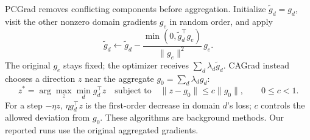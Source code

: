 PCGrad \citep{yu2020gradientsurgerymultitasklearning} removes conflicting components before aggregation. Initialize $\tilde g_d=g_d$, visit the other nonzero domain gradients $g_e$ in random order, and apply
\begin{equation}
\tilde g_d\leftarrow\tilde g_d-
\frac{\min(0,\tilde g_d^\top g_e)}{\|g_e\|^2}\,g_e.
\label{eq:pcgrad}
\end{equation}
The original $g_e$ stays fixed; the optimizer receives $\sum_d\lambda_d\tilde g_d$. CAGrad \citep{liu2024conflictaversegradientdescentmultitask} instead chooses a direction $z$ near the aggregate $g_0=\sum_d\lambda_d g_d$:
\begin{equation}
z^*=\arg\max_z\min_d g_d^\top z
\quad\text{subject to}\quad
\|z-g_0\|\leq c\|g_0\|,\qquad 0\leq c<1.
\label{eq:cagrad}
\end{equation}
For a step $-\eta z$, $\eta g_d^\top z$ is the first-order decrease in domain $d$'s loss; $c$ controls the allowed deviation from $g_0$. These algorithms are background methods. Our reported runs use the original aggregated gradients.
